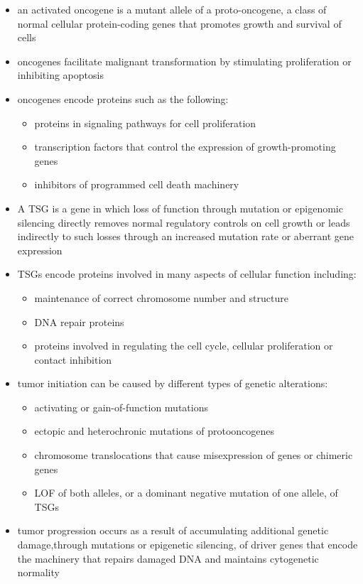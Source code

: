 \documentclass{scrartcl}
\begin{document}
\begin{itemize}
\item an activated oncogene is a mutant allele of a proto-oncogene, a
class of normal cellular protein-coding genes that promotes growth
and survival of cells
\item oncogenes facilitate malignant transformation by stimulating
proliferation or inhibiting apoptosis
\item oncogenes encode proteins such as the following:
\begin{itemize}
\item proteins in signaling pathways for cell proliferation
\item transcription factors that control the expression of growth-promoting genes
\item inhibitors of programmed cell death machinery
\end{itemize}
\item A TSG is a gene in which loss of function through mutation or
epigenomic silencing directly removes normal regulatory controls on
cell growth or leads indirectly to such losses through an increased
mutation rate or aberrant gene expression
\item TSGs encode proteins involved in many aspects of cellular function including:
\begin{itemize}
\item maintenance of correct chromosome number and structure
\item DNA repair proteins
\item proteins involved in regulating the cell cycle, cellular
proliferation or contact inhibition
\end{itemize}

\item tumor initiation can be caused by different types of genetic
alterations:
\begin{itemize}
\item activating or gain-of-function mutations
\item ectopic and heterochronic mutations of protooncogenes
\item chromosome translocations that cause misexpression of genes or chimeric genes
\item LOF of both alleles, or a dominant negative mutation of one allele, of TSGs
\end{itemize}

\item tumor progression occurs as a result of accumulating additional
genetic damage,through mutations or epigenetic silencing, of driver
genes that encode the machinery that repairs damaged DNA and
maintains cytogenetic normality
\end{itemize}
\end{document}
